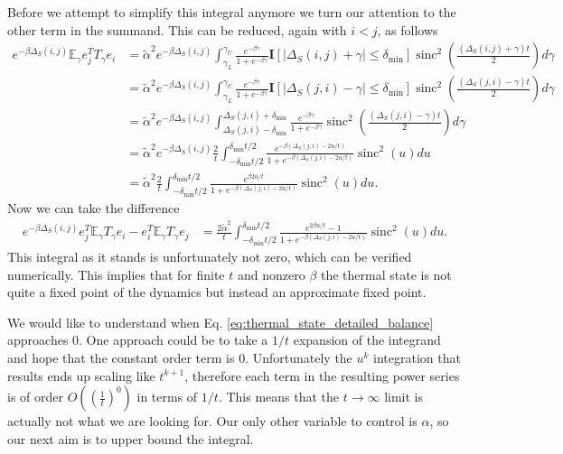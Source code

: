 \documentclass{article}
\newcommand{\EE}{\mathbb{E}}
\newcommand{\bigo}[1]{O\left(#1\right)}
\DeclareMathOperator{\sinc}{sinc}
\begin{document}
Before we attempt to simplify this integral anymore we turn our attention to the other term in the summand. This can be reduced, again with $i < j$, as follows
\begin{align}
    e^{-\beta \Delta_S(i,j)} \EE_\gamma e_j^T T_\gamma e_i &= \widetilde{\alpha}^2 e^{-\beta \Delta_S(i,j)} \int_{\gamma_L}^{\gamma_U} \frac{e^{-\beta \gamma}}{1 + e^{-\beta \gamma}} \mathbf{I}[|\Delta_S(i,j) + \gamma| \le \delta_{\min}] \sinc^2 \left( \frac{(\Delta_S(i,j) + \gamma) t}{2} \right) d\gamma \\
    &=\widetilde{\alpha}^2 e^{-\beta \Delta_S(i,j)} \int_{\gamma_L}^{\gamma_U} \frac{e^{-\beta \gamma}}{1 + e^{-\beta \gamma}} \mathbf{I}[|\Delta_S(j, i) - \gamma| \le \delta_{\min}] \sinc^2 \left( \frac{(\Delta_S(j,i) - \gamma) t}{2} \right) d\gamma \\
    &=\widetilde{\alpha}^2 e^{-\beta \Delta_S(i,j)} \int_{\Delta_S(j,i) - \delta_{\min}}^{\Delta_S(j,i) + \delta_{\min}} \frac{e^{-\beta \gamma}}{1 + e^{-\beta \gamma}}  \sinc^2 \left( \frac{(\Delta_S(j,i) - \gamma) t}{2} \right) d\gamma \\
    &= \widetilde{\alpha}^2 e^{-\beta \Delta_S(i,j)} \frac{2}{t} \int_{-\delta_{\min} t /2}^{\delta_{\min} t / 2} \frac{e^{-\beta (\Delta_S(j,i) - 2 u /t)}}{1 + e^{-\beta (\Delta_S(j,i) - 2 u /t)}} \sinc^2(u) du \\
    &= \widetilde{\alpha}^2 \frac{2}{t} \int_{-\delta_{\min} t /2}^{\delta_{\min} t / 2} \frac{e^{\beta  2 u /t}}{1 + e^{-\beta (\Delta_S(j,i) - 2 u /t)}} \sinc^2 (u) du.
\end{align}
 Now we can take the difference
 \begin{align}
     e^{-\beta \Delta_S(i ,j)} e_j^T \EE_\gamma T_\gamma e_i - e_i^T \EE_\gamma T_\gamma e_j &= \frac{2 \widetilde{\alpha}^2}{t} \int_{-\delta_{\min} t /2}^{\delta_{\min} t / 2} \frac{e^{2 \beta u /t } - 1}{1 + e^{-\beta(\Delta_S(j, i) - 2 u /t)}} \sinc^2(u) du. \label{eq:thermal_state_detailed_balance}
 \end{align}
 This integral as it stands is unfortunately not zero, which can be verified numerically. This implies that for finite $t$ and nonzero $\beta$ the thermal state is not quite a fixed point of the dynamics but instead an approximate fixed point.

We would like to understand when Eq. \eqref{eq:thermal_state_detailed_balance} approaches 0. One approach could be to take a $1/t$ expansion of the integrand and hope that the constant order term is 0. Unfortunately the $u^k$ integration that results ends up scaling like $t^{k + 1}$, therefore each term in the resulting power series is of order $\bigo{\left(\frac{1}{t}\right)^0}$ in terms of $1/t$. This means that the $t \to \infty$ limit is actually not what we are looking for. Our only other variable to control is $\alpha$, so our next aim is to upper bound the integral. 
\end{document}
